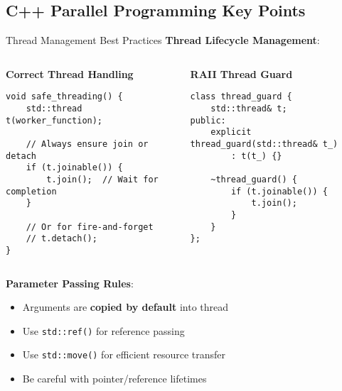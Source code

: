 \subsection{C++ Parallel Programming Key Points}
\begin{frame}[fragile]{ Thread Management Best Practices}
	\textbf{Thread Lifecycle Management}:
	\begin{columns}
		\begin{column}{0.5\textwidth}
			\textbf{Correct Thread Handling}
			\begin{verbatim}
void safe_threading() {
    std::thread t(worker_function);

    // Always ensure join or detach
    if (t.joinable()) {
        t.join();  // Wait for completion
    }

    // Or for fire-and-forget
    // t.detach();
}
			\end{verbatim}
		\end{column}
		\begin{column}{0.5\textwidth}
			\textbf{RAII Thread Guard}
			\begin{verbatim}
class thread_guard {
    std::thread& t;
public:
    explicit thread_guard(std::thread& t_)
        : t(t_) {}

    ~thread_guard() {
        if (t.joinable()) {
            t.join();
        }
    }
};
			\end{verbatim}
		\end{column}
	\end{columns}

	\vspace{1em}
	\textbf{Parameter Passing Rules}:
	\begin{itemize}
		\item Arguments are \textbf{copied by default} into thread
		\item Use \texttt{std::ref()} for reference passing
		\item Use \texttt{std::move()} for efficient resource transfer
		\item Be careful with pointer/reference lifetimes
	\end{itemize}
\end{frame}

